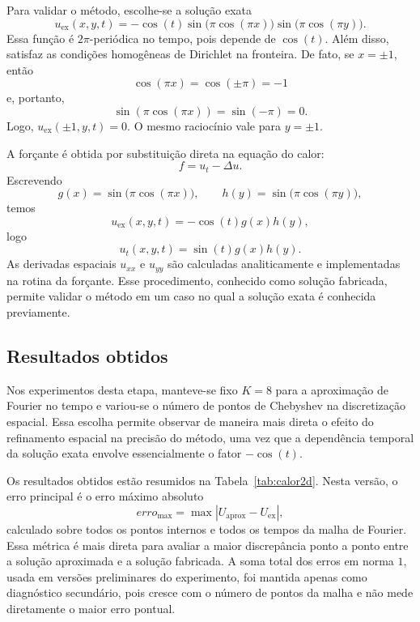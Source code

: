 Para validar o método, escolhe-se a solução exata
\[
u_{\mathrm{ex}}(x,y,t)
=
-\cos(t)\sin\bigl(\pi\cos(\pi x)\bigr)
\sin\bigl(\pi\cos(\pi y)\bigr).
\]
Essa função é \(2\pi\)-periódica no tempo, pois depende de \(\cos(t)\). Além disso, satisfaz as condições homogêneas de Dirichlet na fronteira. De fato, se \(x=\pm1\), então
\[
\cos(\pi x)=\cos(\pm\pi)=-1
\]
e, portanto,
\[
\sin(\pi\cos(\pi x))=\sin(-\pi)=0.
\]
Logo, \(u_{\mathrm{ex}}(\pm1,y,t)=0\). O mesmo raciocínio vale para \(y=\pm1\).

A forçante é obtida por substituição direta na equação do calor:
\[
f=u_t-\Delta u.
\]
Escrevendo
\[
g(x)=\sin\bigl(\pi\cos(\pi x)\bigr),
\qquad
h(y)=\sin\bigl(\pi\cos(\pi y)\bigr),
\]
temos
\[
u_{\mathrm{ex}}(x,y,t)=-\cos(t)g(x)h(y),
\]
logo
\[
u_t(x,y,t)=\sin(t)g(x)h(y).
\]
As derivadas espaciais \(u_{xx}\) e \(u_{yy}\) são calculadas analiticamente e implementadas na rotina da forçante. Esse procedimento, conhecido como solução fabricada, permite validar o método em um caso no qual a solução exata é conhecida previamente.

\subsection{Resultados obtidos}

Nos experimentos desta etapa, manteve-se fixo \(K=8\) para a aproximação de Fourier no tempo e variou-se o número de pontos de Chebyshev na discretização espacial. Essa escolha permite observar de maneira mais direta o efeito do refinamento espacial na precisão do método, uma vez que a dependência temporal da solução exata envolve essencialmente o fator \(-\cos(t)\).

Os resultados obtidos estão resumidos na Tabela~\ref{tab:calor2d}. Nesta versão, o erro principal é o erro máximo absoluto
\[
erro_{\max}=\max |U_{\mathrm{aprox}}-U_{\mathrm{ex}}|,
\]
calculado sobre todos os pontos internos e todos os tempos da malha de Fourier. Essa métrica é mais direta para avaliar a maior discrepância ponto a ponto entre a solução aproximada e a solução fabricada. A soma total dos erros em norma \(1\), usada em versões preliminares do experimento, foi mantida apenas como diagnóstico secundário, pois cresce com o número de pontos da malha e não mede diretamente o maior erro pontual.

